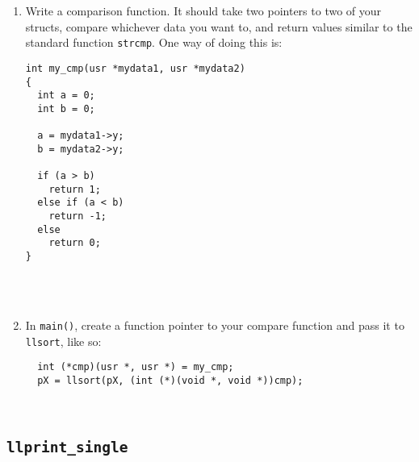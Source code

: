\documentclass{article}
\begin{document}
\begin{enumerate}
\item Write a comparison function. It should take two pointers to two of your structs, compare
  whichever data you want to, and return values similar to the standard function \verb|strcmp|.
  One way of doing this is:\\[8pt]
\begin{verbatim}
int my_cmp(usr *mydata1, usr *mydata2)
{
  int a = 0;
  int b = 0;
  
  a = mydata1->y;
  b = mydata2->y;
  
  if (a > b)
    return 1;
  else if (a < b)
    return -1;
  else
    return 0;
}
\end{verbatim}
\\[8pt]
\\

\item In \verb|main()|, create a function pointer to your compare function and pass it to
  \verb|llsort|, like so:\\[8pt]
\begin{verbatim}
  int (*cmp)(usr *, usr *) = my_cmp;
  pX = llsort(pX, (int (*)(void *, void *))cmp);
\end{verbatim}
\end{enumerate}

\\

\subsection{\texttt{llprint\_single}}
\label{llprintsingle}
\end{document}
